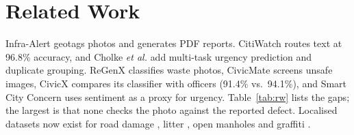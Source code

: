 \documentclass[conference]{IEEEtran}
\begin{document}
\section{Related Work}\label{sec:rw}
Infra-Alert \cite{infraalert} geotags photos and generates PDF reports. CitiWatch \cite{citiwatch} routes text at 96.8\% accuracy, and Cholke \textit{et al.} \cite{cholke} add multi-task urgency prediction and duplicate grouping. ReGenX \cite{regenx} classifies waste photos, CivicMate \cite{civicmate} screens unsafe images, CivicX \cite{civicx} compares its classifier with officers (91.4\% vs.\ 94.1\%), and Smart City Concern \cite{smartcity} uses sentiment as a proxy for urgency. Table~\ref{tab:rw} lists the gaps; the largest is that none checks the photo against the reported defect. Localised datasets now exist for road damage \cite{rdd2022,roboflow}, litter \cite{taco}, open manholes \cite{roadhazards} and graffiti \cite{storm}.
\end{document}
